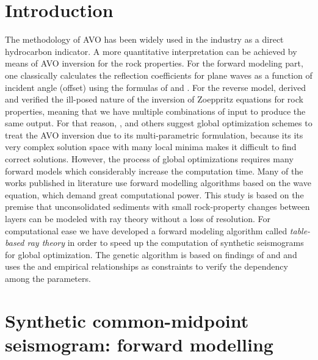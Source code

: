 \documentclass{vie16}
\begin{document}
\section{Introduction}
The methodology of AVO has been widely used in the industry as a direct
hydrocarbon indicator. A more quantitative interpretation can be
achieved by means of AVO inversion for the rock properties. For the
forward modeling part,
one classically calculates the reflection coefficients for
plane waves as a function of incident angle (offset) using the formulas
of \cite{Knott1899} and \cite{Zoeppritz1919}. For the reverse model,
\cite{Rosa1976} derived and verified the ill-posed nature of the
inversion of Zoeppritz equations for rock properties, meaning
that we have multiple combinations of input to produce the same
output.  For that reason, \cite{Stoffa1991}, \cite{Mallick1995} and
others suggest global optimization schemes to treat the AVO
inversion due to its multi-parametric formulation, because its
its very complex solution space with many local minima
makes it difficult to find correct solutions. However, the
process of global optimizations requires many forward models
which considerably increase the computation time. Many of the
works published in literature use forward modelling algorithms
based on the wave equation, which demand great computational
power. This study is based on the premise that unconsolidated
sediments with small rock-property changes between layers can be
modeled with ray theory without a loss of resolution. For
computational ease we have developed a forward modeling
algorithm called \textit{table-based ray theory} in order to
speed up the computation of synthetic seismograms for global
optimization.  The genetic algorithm is based on findings of
\cite{Stoffa1991} and \cite{Sen1992} and uses the
\cite{Gardner1974} and \cite{Castagna1985} empirical
relationships as constraints to verify the dependency among the
parameters.

\section{Synthetic common-midpoint seismogram: forward
modelling} 
\end{document}
